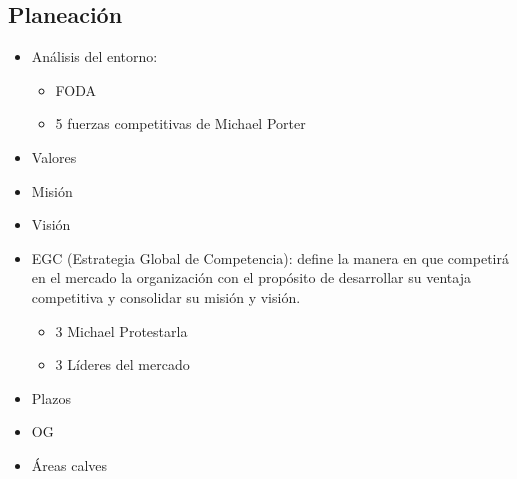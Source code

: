 \subsection{Planeación}
\begin{itemize}
    \item Análisis del entorno:
        \begin{itemize}
            \item FODA 
            \item 5 fuerzas competitivas de Michael Porter 
        \end{itemize}
        
    \item Valores     
    \item Misión 
    \item Visión     
    \item EGC (Estrategia Global de Competencia): define la manera en que competirá en el mercado la organización con el propósito de desarrollar su ventaja competitiva y consolidar su misión y visión.
        \begin{itemize}
            \item 3 Michael Protestarla 
            \item 3 Líderes del mercado
        \end{itemize}
    
    \item Plazos
    \item OG
    \item Áreas calves 
\end{itemize}


